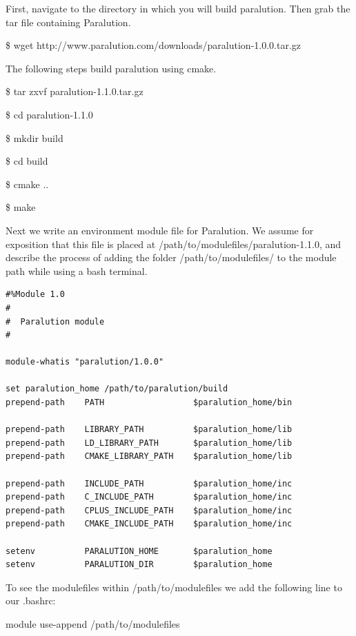 \documentclass{report}
\begin{document}
\noindent First, navigate to the directory in which you will build paralution.
Then grab the tar file containing Paralution.

\begin{mdframed}[style=MyFrame]
\$ wget http://www.paralution.com/downloads/paralution-1.0.0.tar.gz
\end{mdframed}

\noindent The following steps build paralution using cmake.

\begin{mdframed}[style=MyFrame]
  \$ tar zxvf paralution-1.1.0.tar.gz

  \noindent\$ cd paralution-1.1.0

  \noindent\$ mkdir build

  \noindent\$ cd build

  \noindent\$ cmake ..

  \noindent\$ make
\end{mdframed}

\noindent Next we write an environment module file for Paralution.
We assume for exposition that this file is placed at /path/to/modulefiles/paralution-1.1.0, and
describe the process of adding the folder /path/to/modulefiles/ to the module path while using
a bash terminal.

\lstset{style=custom}
\begin{lstlisting}
#%Module 1.0
#
#  Paralution module
#

module-whatis "paralution/1.0.0"

set paralution_home /path/to/paralution/build
prepend-path    PATH                  $paralution_home/bin

prepend-path    LIBRARY_PATH          $paralution_home/lib
prepend-path    LD_LIBRARY_PATH       $paralution_home/lib
prepend-path    CMAKE_LIBRARY_PATH    $paralution_home/lib

prepend-path    INCLUDE_PATH          $paralution_home/inc
prepend-path    C_INCLUDE_PATH        $paralution_home/inc
prepend-path    CPLUS_INCLUDE_PATH    $paralution_home/inc
prepend-path    CMAKE_INCLUDE_PATH    $paralution_home/inc

setenv          PARALUTION_HOME       $paralution_home
setenv          PARALUTION_DIR        $paralution_home
\end{lstlisting}

\noindent To see the modulefiles within /path/to/modulefiles we add the following
line to our .bashrc:
\begin{mdframed}[style=MyFrame]
  module use-append /path/to/modulefiles
\end{mdframed}
\end{document}
